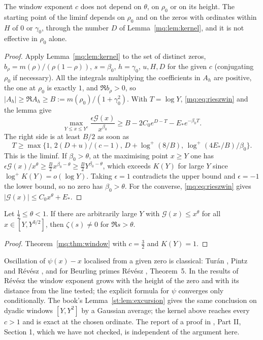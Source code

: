 The window exponent $c$ does not depend on $\theta$, on $\rho_0$ or on its height. The starting point of the liminf depends on $\rho_0$ and on the zeros with ordinates within $H$ of $0$ or $\gamma_0$, through the number $D$ of Lemma~\ref{mq:lem:kernel}, and it is not effective in $\rho_0$ alone.

\begin{proof}
Apply Lemma~\ref{mq:lem:kernel} to the set of distinct zeros, $b_\rho=m(\rho)/(\rho(1-\rho))$, $s=\beta_0$, $h=\gamma_0$, $u,H,D$ for the given $c$ (conjugating $\rho_0$ if necessary). All the integrals multiplying the coefficients in $A_h$ are positive, the one at $\rho_0$ is exactly $1$, and $\Re b_\rho>0$, so $|A_h|\ge\Re A_h\ge B:=m(\rho_0)/(1+\gamma_0^2)$. With $T=\log Y$, \eqref{mq:eq:rieszwin} and the lemma give
\[
\max_{Y\le x\le Y^c}\frac{\epsilon\mathcal G(x)}{x^{\beta_0}}\ge B-2C_0e^{D-T}-E_*e^{-\beta_0T}.
\]
The right side is at least $B/2$ as soon as
\[
T\ge\max\{1,\,2(D+u)/(c-1),\,D+\log^+(8/B),\,\log^+(4E_*/B)/\beta_0\}.
\]
 This is the liminf. If $\beta_0>\theta$, at the maximising point $x\ge Y$ one has $\epsilon\mathcal G(x)/x^\theta\ge\frac B2x^{\beta_0-\theta}\ge\frac B2Y^{\beta_0-\theta}$, which exceeds $K(Y)$ for large $Y$ since $\log^+K(Y)=o(\log Y)$. Taking $\epsilon=1$ contradicts the upper bound and $\epsilon=-1$ the lower bound, so no zero has $\beta_0>\theta$. For the converse, \eqref{mq:eq:rieszwin} gives $|\mathcal G(x)|\le C_0x^\theta+E_*$.
\end{proof}

\begin{corollary}\label{mq:hyp:window}
Let $\frac12\le\theta<1$. If there are arbitrarily large $Y$ with $\mathcal G(x)\le x^\theta$ for all $x\in[Y,Y^{3/2}]$, then $\zeta(s)\ne0$ for $\Re s>\theta$.
\end{corollary}

\begin{proof}
Theorem~\ref{mq:thm:window} with $c=\frac32$ and $K(Y)=1$.
\end{proof}

\begin{remark}[Literature]\label{mq:rem:windowlit}
Oscillation of $\psi(x)-x$ localised from a given zero is classical: Tur\'an \cite{Turan50}, Pintz \cite{Pintz80} and R\'ev\'esz \cite{Revesz88}, and for Beurling primes R\'ev\'esz \cite{Revesz23}, Theorem~5. In the results of R\'ev\'esz the window exponent grows with the height of the zero and with its distance from the line tested; the explicit formula for $\psi$ converges only conditionally. The book's Lemma~\ref{st:lem:excursion} gives the same conclusion on dyadic windows $[Y,Y^2]$ by a Gaussian average; the kernel above reaches every $c>1$ and is exact at the chosen ordinate. The report of a proof in \cite{Rub26}, Part II, Section 1, which we have not checked, is independent of the argument here.
\end{remark}

